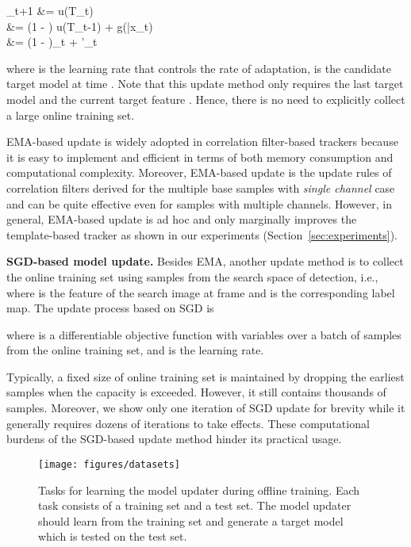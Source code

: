 \documentclass[journal]{IEEEtran}
\begin{document}
    \theta_{t+1} &= u(T_t)  \\
                 &= (1 - \alpha) u(T_{t-1}) + \alpha g(\bar{x}_t) \\
                 &= (1 - \alpha)\theta_t + \alpha \theta'_t
	
where  is the learning rate that controls the rate of adaptation,  is the candidate target model at time . Note that this update method only requires the last target model  and the current target feature . Hence, there is no need to explicitly collect a large online training set.

EMA-based update is widely adopted in correlation filter-based trackers because it is easy to implement and efficient in terms of both memory consumption and computational complexity. Moreover, EMA-based update is the update rules of correlation filters derived for the multiple base samples with \emph{single channel} case \cite{bolme2010visual} and can be quite effective even for samples with multiple channels. However, in general, EMA-based update is ad hoc and only marginally improves the template-based tracker as shown in our experiments (Section~\ref{sec:experiments}).

\textbf{SGD-based model update.} Besides EMA, another update method is to collect the online training set using samples from the search space of detection, i.e.,  where  is the feature of the search image at frame  and  is the corresponding label map. The update process based on SGD is

where  is a differentiable objective function with variables  over a batch of samples  from the online training set, and  is the learning rate. 

Typically, a fixed size of online training set is maintained by dropping the earliest samples when the capacity is exceeded. However, it still contains thousands of samples. Moreover, we show only one iteration of SGD update for brevity while it generally requires dozens of iterations to take effects. These computational burdens of the SGD-based update method hinder its practical usage.

\begin{figure}
	\centering
	\texttt{[image: figures/datasets]}
	\caption{Tasks for learning the model updater during offline training. Each task consists of a training set and a test set. The model updater should learn from the training set and generate a target model which is tested on the test set.}
	\label{fig:datasets}
\end{figure}
\end{document}
